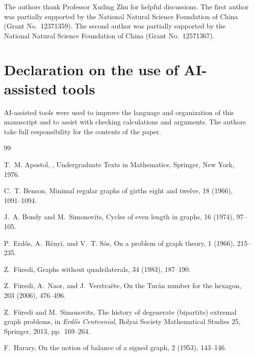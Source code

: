 \documentclass{article}
\theoremstyle{definition}
\theoremstyle{remark}
\begin{document}
The authors thank Professor Xuding Zhu for helpful discussions. The first author
was partially supported by the National Natural Science Foundation of China
(Grant No.~12371359). The second author
was partially supported by the National Natural Science Foundation of China
(Grant No.~12571367).

\section*{Declaration on the use of AI-assisted tools}

AI-assisted tools were used to improve the language and organization of this
manuscript and to assist with checking calculations and arguments. The authors
take full responsibility for the contents of the paper.


\begin{thebibliography}{99}

T.~M. Apostol,
,
\newblock Undergraduate Texts in Mathematics, Springer, New York, 1976.

C.~T. Benson,
\newblock Minimal regular graphs of girths eight and twelve,
 18 (1966), 1091--1094.

J.~A. Bondy and M.~Simonovits,
\newblock Cycles of even length in graphs,
 16 (1974), 97--105.

P.~Erd\H{o}s, A.~R\'enyi, and V.~T. S\'os,
\newblock On a problem of graph theory,
 1 (1966), 215--235.

Z.~F\"uredi,
\newblock Graphs without quadrilaterals,
 34 (1983), 187--190.

Z.~F\"uredi, A.~Naor, and J.~Verstra\"ete,
\newblock On the Tur\'an number for the hexagon,
 203 (2006), 476--496.

Z.~F\"uredi and M.~Simonovits,
\newblock The history of degenerate (bipartite) extremal graph problems,
\newblock in {\em Erd\H{o}s Centennial}, Bolyai Society Mathematical Studies 25,
Springer, 2013, pp.~169--264.

F.~Harary,
\newblock On the notion of balance of a signed graph,
 2 (1953), 143--146.


\end{thebibliography}
\end{document}
